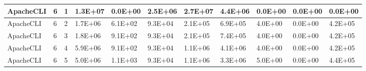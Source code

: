 \begin{table*}[]
\begin{tabular}{@{}lllllllllll@{}}
        ApacheCLI                                                & 6                                                       & 1    & 1.3E+07                                                     & 0.0E+00                                                               & 2.5E+06                                                 & 2.7E+07                                                    & 4.4E+06                                                        & 0.0E+00                                                & 0.0E+00                                                   & 0.0E+00 \\ \midrule
        ApacheCLI                                                & 6                                                       & 2    & 1.7E+06                                                     & 6.1E+02                                                               & 9.3E+04                                                 & 2.1E+05                                                    & 6.9E+05                                                        & 4.0E+00                                                & 0.0E+00                                                   & 4.2E+05 \\ \midrule
        ApacheCLI                                                & 6                                                       & 3    & 1.8E+06                                                     & 9.1E+02                                                               & 9.3E+04                                                 & 2.1E+05                                                    & 7.4E+05                                                        & 4.0E+00                                                & 0.0E+00                                                   & 4.2E+05 \\ \midrule
        ApacheCLI                                                & 6                                                       & 4    & 5.9E+06                                                     & 9.1E+02                                                               & 9.3E+04                                                 & 1.1E+06                                                    & 4.1E+06                                                        & 4.0E+00                                                & 0.0E+00                                                   & 4.2E+05 \\ \midrule
        ApacheCLI                                                & 6                                                       & 5    & 5.0E+06                                                     & 1.1E+03                                                               & 9.3E+04                                                 & 1.1E+06                                                    & 3.3E+06                                                        & 5.0E+00                                                & 0.0E+00                                                   & 4.4E+05 \\ \midrule

\end{tabular}
\end{table*}
